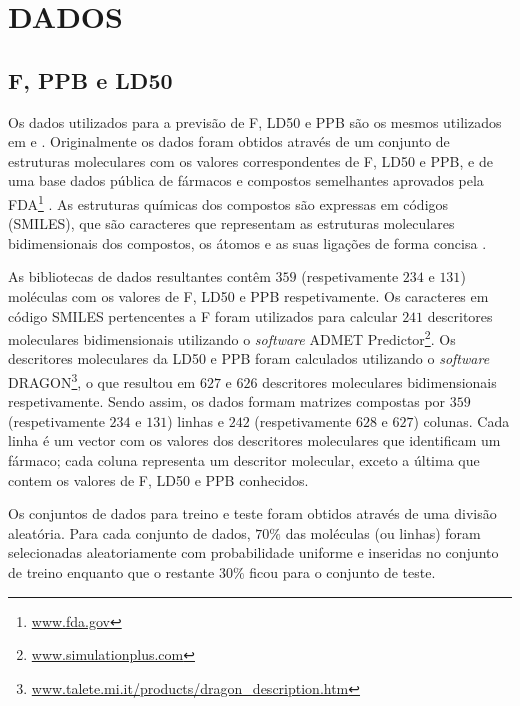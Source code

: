 \section{DADOS}
\label{sec:5dados}

\subsection{\ac{F}, \ac{PPB} e \ac{LD50}}

Os dados utilizados para a previsão de \ac{F}, \ac{LD50} e \ac{PPB} são os mesmos utilizados em \citep{Archetti:2006,Archetti2007} e \citep{Yoshida2000}.
Originalmente os dados foram obtidos através de um conjunto de estruturas moleculares com os valores correspondentes de \ac{F}, \ac{LD50} e \ac{PPB},
e de uma base dados pública de fármacos e compostos semelhantes aprovados pela \ac{FDA}\footnote{\url{www.fda.gov}} \citep{Wishart06}. As estruturas 
químicas dos compostos são expressas em códigos (\ac{SMILES}), 
que são caracteres que representam as estruturas moleculares bidimensionais dos compostos, os átomos e as suas ligações de forma concisa \citep{weininger1988smiles}.

As bibliotecas de dados resultantes contêm $359$ (respetivamente $234$ e $131$) moléculas com os valores de \ac{F}, \ac{LD50} e \ac{PPB} respetivamente. 
Os caracteres em código \ac{SMILES} pertencentes a \ac{F} foram utilizados para calcular $241$ descritores moleculares 
bidimensionais utilizando o \emph{software} \ac{ADMET} Predictor\footnote{\url{www.simulationplus.com}}. Os descritores moleculares da \ac{LD50} e \ac{PPB}
foram calculados utilizando o \emph{software} DRAGON\footnote{\url{www.talete.mi.it/products/dragon_description.htm}},
o que resultou em $627$ e $626$ descritores moleculares bidimensionais respetivamente. Sendo assim, os dados formam matrizes compostas por 
$359$ (respetivamente $234$ e $131$) linhas e $242$ (respetivamente $628$ e $627$) colunas. 
Cada linha é um vector com os valores dos descritores moleculares que identificam um fármaco; cada coluna representa um descritor molecular, 
exceto a última que contem os valores de \ac{F}, \ac{LD50} e \ac{PPB} conhecidos.

Os conjuntos de dados para treino e teste foram obtidos através de uma divisão aleatória. Para cada conjunto de dados, $70\%$ das moléculas 
(ou linhas) foram selecionadas aleatoriamente com probabilidade uniforme e inseridas no conjunto de treino
enquanto que o restante $30\%$ ficou para o conjunto de teste.

